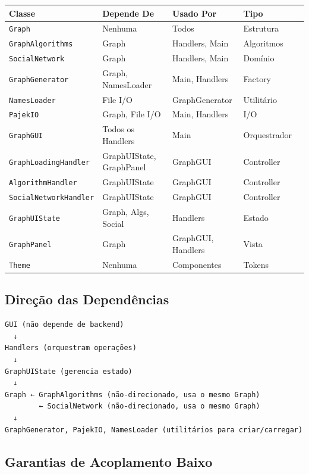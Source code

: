 \documentclass[12pt,a4paper]{article}
\begin{document}
\begin{table}[h]
\centering
\begin{tabular}{|l|l|l|l|l|}
\hline
\textbf{Classe} & \textbf{Depende De} & \textbf{Usado Por} & \textbf{Tipo} \\
\hline
\texttt{Graph} & Nenhuma & Todos & Estrutura \\
\hline
\texttt{GraphAlgorithms} & Graph & Handlers, Main & Algoritmos \\
\hline
\texttt{SocialNetwork} & Graph & Handlers, Main & Domínio \\
\hline
\texttt{GraphGenerator} & Graph, NamesLoader & Main, Handlers & Factory \\
\hline
\texttt{NamesLoader} & File I/O & GraphGenerator & Utilitário \\
\hline
\texttt{PajekIO} & Graph, File I/O & Main, Handlers & I/O \\
\hline
\texttt{GraphGUI} & Todos os Handlers & Main & Orquestrador \\
\hline
\texttt{GraphLoadingHandler} & GraphUIState, GraphPanel & GraphGUI & Controller \\
\hline
\texttt{AlgorithmHandler} & GraphUIState & GraphGUI & Controller \\
\hline
\texttt{SocialNetworkHandler} & GraphUIState & GraphGUI & Controller \\
\hline
\texttt{GraphUIState} & Graph, Algs, Social & Handlers & Estado \\
\hline
\texttt{GraphPanel} & Graph & GraphGUI, Handlers & Vista \\
\hline
\texttt{Theme} & Nenhuma & Componentes & Tokens \\
\hline
\end{tabular}
\end{table}

\subsection{Direção das Dependências}

\begin{verbatim}
GUI (não depende de backend)
  ↓
Handlers (orquestram operações)
  ↓
GraphUIState (gerencia estado)
  ↓
Graph ← GraphAlgorithms (não-direcionado, usa o mesmo Graph)
        ← SocialNetwork (não-direcionado, usa o mesmo Graph)
  ↓
GraphGenerator, PajekIO, NamesLoader (utilitários para criar/carregar)
\end{verbatim}

\subsection{Garantias de Acoplamento Baixo}
\end{document}
